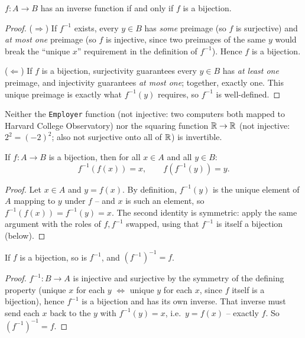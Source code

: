 \documentclass[11pt]{article}
\begin{document}
\begin{theorem}
$f: A \to B$ has an inverse function if and only if $f$ is a bijection.
\end{theorem}
\begin{proof}
($\Rightarrow$) If $f^{-1}$ exists, every $y \in B$ has \emph{some} preimage (so $f$ is surjective) and \emph{at most one} preimage (so $f$ is injective, since two preimages of the same $y$ would break the ``unique $x$'' requirement in the definition of $f^{-1}$). Hence $f$ is a bijection.

($\Leftarrow$) If $f$ is a bijection, surjectivity guarantees every $y \in B$ has \emph{at least one} preimage, and injectivity guarantees \emph{at most one}; together, exactly one. This unique preimage is exactly what $f^{-1}(y)$ requires, so $f^{-1}$ is well-defined.
\end{proof}

\begin{note}
Neither the \texttt{Employer} function (not injective: two computers both mapped to Harvard College Observatory) nor the squaring function $\mathbb{R} \to \mathbb{R}$ (not injective: $2^2=(-2)^2$; also not surjective onto all of $\mathbb{R}$) is invertible.
\end{note}

\begin{theorem}
If $f: A \to B$ is a bijection, then for all $x \in A$ and all $y \in B$:
\[
f^{-1}(f(x)) = x, \qquad f(f^{-1}(y)) = y.
\]
\end{theorem}
\begin{proof}
Let $x \in A$ and $y = f(x)$. By definition, $f^{-1}(y)$ is the unique element of $A$ mapping to $y$ under $f$ -- and $x$ is such an element, so $f^{-1}(f(x)) = f^{-1}(y) = x$. The second identity is symmetric: apply the same argument with the roles of $f, f^{-1}$ swapped, using that $f^{-1}$ is itself a bijection (below).
\end{proof}

\begin{theorem}
If $f$ is a bijection, so is $f^{-1}$, and $(f^{-1})^{-1} = f$.
\end{theorem}
\begin{proof}
$f^{-1}: B \to A$ is injective and surjective by the symmetry of the defining property (unique $x$ for each $y$ $\Leftrightarrow$ unique $y$ for each $x$, since $f$ itself is a bijection), hence $f^{-1}$ is a bijection and has its own inverse. That inverse must send each $x$ back to the $y$ with $f^{-1}(y)=x$, i.e.\ $y=f(x)$ -- exactly $f$. So $(f^{-1})^{-1}=f$.
\end{proof}
\end{document}
